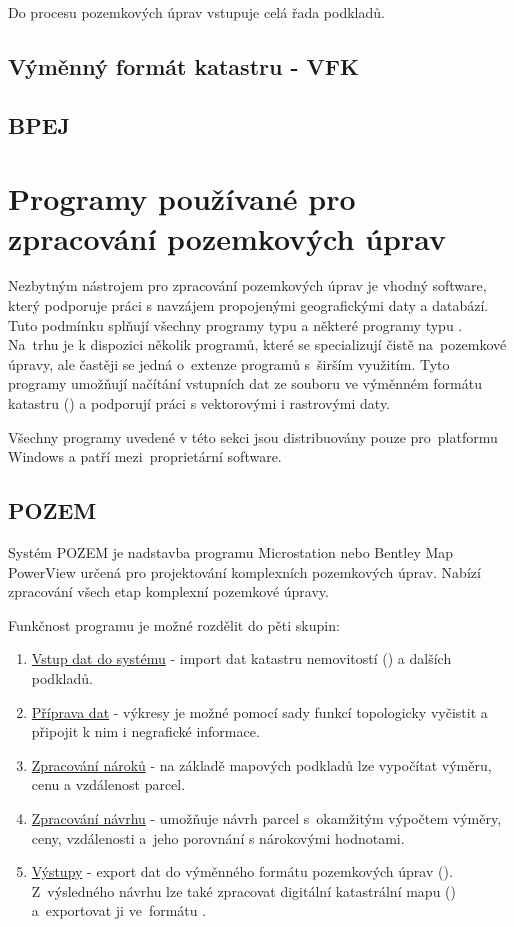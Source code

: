 Do procesu pozemkových úprav vstupuje celá řada podkladů.

\subsection{Výměnný formát katastru - VFK}
\label{vfk}

\subsection{BPEJ}
\label{bpej}

\section{Programy používané pro zpracování pozemkových úprav}
\label{programy_pu}

Nezbytným nástrojem pro zpracování pozemkových úprav je vhodný software, který podporuje práci s navzájem propojenými geografickými daty a databází. Tuto podmínku splňují všechny programy typu  a některé programy typu . Na~trhu je k dispozici několik programů, které se specializují čistě na~pozemkové úpravy, ale častěji se jedná o~extenze programů s~širším využitím. Tyto programy umožňují načítání vstupních dat ze souboru ve výměnném formátu katastru () a podporují práci s vektorovými i rastrovými daty.

Všechny programy uvedené v této sekci jsou distribuovány pouze pro~platformu Windows a patří mezi~proprietární software.

\subsection{POZEM}
\label{pozem}

Systém POZEM \citep{pozem} je nadstavba programu Microstation nebo Bentley Map PowerView určená pro projektování komplexních pozemkových úprav. Nabízí zpracování všech etap komplexní pozemkové úpravy.

Funkčnost programu je možné rozdělit do pěti skupin:
	\begin{enumerate}[leftmargin=1.5cm]
		\item \underline{Vstup dat do systému} - import dat katastru nemovitostí () a dalších podkladů.
		\item \underline{Příprava dat} - výkresy je možné pomocí sady funkcí topologicky vyčistit a připojit k nim i negrafické informace.
		\item \underline{Zpracování nároků} - na základě mapových podkladů lze vypočítat výměru, cenu a vzdálenost parcel. 
		\item \underline{Zpracování návrhu} - umožňuje návrh parcel s~okamžitým výpočtem výměry, ceny, vzdálenosti a~jeho porovnání s nárokovými hodnotami.
		\item \underline{Výstupy} - export dat do výměnného formátu pozemkových úprav (). Z~výsledného návrhu lze také zpracovat digitální katastrální mapu () a~exportovat ji ve~formátu .
	\end{enumerate}


